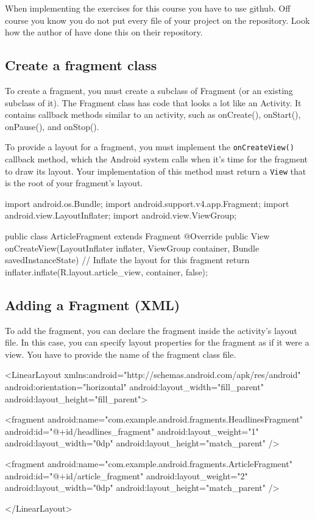 \begin{framed}
	When implementing the exercises for this course you have to use github. Off course you know you do not put every file of your project on the repository. Look how the author of \cite{murphymarkl.2017} have done this on their repository. 
\end{framed}

\subsection{Create a fragment class}

To create a fragment, you must create a subclass of Fragment (or an existing subclass of it). The Fragment class has code that looks a lot like an Activity. It contains callback methods similar to an activity, such as onCreate(), onStart(), onPause(), and onStop().

To provide a layout for a fragment, you must implement the \texttt{onCreateView()} callback method, which the Android system calls when it's time for the fragment to draw its layout. Your implementation of this method must return a \texttt{View} that is the root of your fragment's layout.


\begin{android}
	import android.os.Bundle;
	import android.support.v4.app.Fragment;
	import android.view.LayoutInflater;
	import android.view.ViewGroup;
	
	public class ArticleFragment extends Fragment {
		@Override
		public View onCreateView(LayoutInflater inflater, ViewGroup container,
		Bundle savedInstanceState) {
			// Inflate the layout for this fragment
			return inflater.inflate(R.layout.article_view, container, false);
		}
	}
\end{android}

\subsection{Adding a Fragment (XML)}
To add the fragment, you can
declare the fragment inside the activity's layout file.
	In this case, you can specify layout properties for the fragment as if it were a view. You have to provide the name of the fragment class file.


\begin{xml}
	<LinearLayout xmlns:android="http://schemas.android.com/apk/res/android"
	android:orientation="horizontal"
	android:layout_width="fill_parent"
	android:layout_height="fill_parent">
	
	<fragment android:name="com.example.android.fragments.HeadlinesFragment"
	android:id="@+id/headlines_fragment"
	android:layout_weight="1"
	android:layout_width="0dp"
	android:layout_height="match_parent" />
	
	<fragment android:name="com.example.android.fragments.ArticleFragment"
	android:id="@+id/article_fragment"
	android:layout_weight="2"
	android:layout_width="0dp"
	android:layout_height="match_parent" />
	
	</LinearLayout>
\end{xml}

